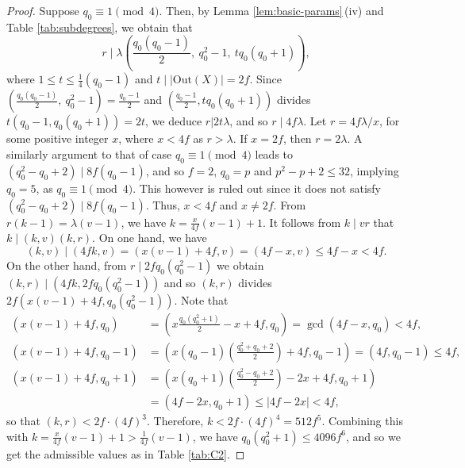 \documentclass[a4paper,twopage,reqno,12pt]{amsart}
\theoremstyle{definition}
\numberwithin{equation}{section}
\newcommand{\Out}{\mathrm{Out}}
\begin{document}
\begin{proof}
Suppose $q_0\equiv 1 \pmod{4}$. 
Then, by Lemma \ref{lem:basic-params}\,(iv) and  Table \ref{tab:subdegrees}, we obtain that
\begin{equation}\label{eq:r.div.gcd.1}
    r\mid \lambda \left(\frac{q_0(q_0-1)}{2}, \ q_0^2-1, \ tq_0(q_0+1) \right),
\end{equation}
where $1\le t \le \tfrac{1}{4}(q_0-1)$ and $t\mid |\Out(X)|=2f$. 
Since $\left(\frac{q_0(q_0-1)}{2}, \ q_0^2-1\right)=\frac{q_0-1}{2}$ 
and $\left(\frac{q_0-1}{2}, tq_0(q_0+1)\right)$ divides $t(q_0-1,q_0(q_0+1))=2t$, 
we deduce $r|2t\lambda$,  and so $r\mid4f\lambda$.
Let $r=4f\lambda/x$, for some positive integer $x$, where $x<4f$ as $r>\lambda$.
If $x=2f$, then $r=2\lambda$.
A similarly argument to that of case $q_0\equiv 1 \pmod{4}$ leads to $(q_0^2-q_0+2)\mid 8f(q_0-1)$,
and so $f=2$, $q_0=p$ and $p^2-p+2\le 32$, 
implying $q_0=5$, as $q_0\equiv1\pmod{4}$. This however is ruled out since it does not satisfy $(q_0^2-q_0+2)\mid 8f(q_0-1)$.
Thus, $x<4f$ and $x\neq 2f$.
From $r(k-1)=\lambda(v-1)$, we have 
$k=\frac{x}{4f}(v-1)+1$.
It follows from $k\mid vr$ that $k\mid (k,v)(k,r)$.
On one hand, we have 
\[
(k,v) \mid (4fk,v)=(x(v-1)+4f,v)=(4f-x,v)\le 4f-x<4f.
\]
On the other hand, from $r\mid 2fq_0(q_0^2-1)$ we obtain 
$(k,r) \mid (4fk,2fq_0(q_0^2-1))$ and so 
$(k,r)$ divides $2f\left(x(v-1)+4f,q_0(q_0^2-1)\right)$.
Note that 
\begin{align*}
(x(v-1)+4f,q_0)&=\left(x\frac{q_0(q_0^2+1)}{2}-x+4f,q_0\right)=\gcd(4f-x,q_0)<4f,\\
(x(v-1)+4f, q_0-1)&=\left(x(q_0-1)\left(\frac{q_0^2+q_0+2}{2}\right)+4f,q_0-1\right)
        =(4f,q_0-1)\le 4f,\\
(x(v-1)+4f, q_0+1)&=\left(x(q_0+1)\left(\frac{q_0^2-q_0+2}{2}\right)-2x+4f,q_0+1\right)\\
         &=(4f-2x,q_0+1)\le |4f-2x|<4f,           
\end{align*}
so that $(k,r)<2f\cdot (4f)^3$.
Therefore, $k<2f\cdot (4f)^4=512f^5$.
Combining this with $k=\frac{x}{4f}(v-1)+1>\frac{1}{4f}(v-1)$, 
we have $q_0(q_0^2+1)\le 4096f^6$, and so we get the admissible values as in Table \ref{tab:C2}.


\end{proof}
\end{document}
